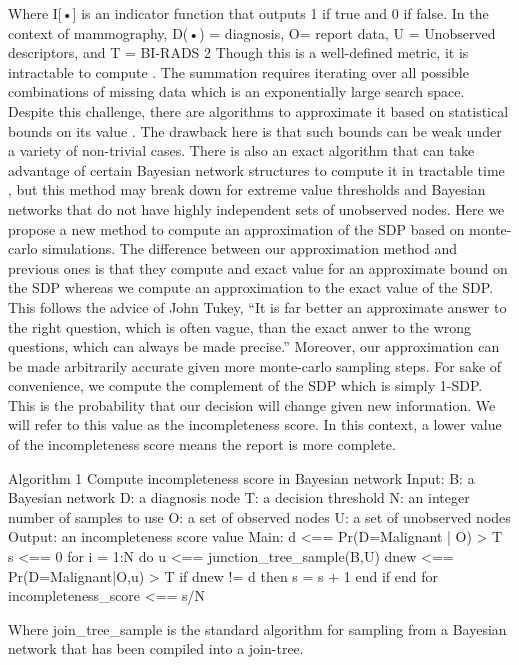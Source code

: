 Where I[•] is an indicator function that outputs 1 if true and 0 if false. 
In the context of mammography, D(•) = diagnosis, O= report data, U = Unobserved descriptors, and T = BI-RADS 2%
Though this is a well-defined metric, it is intractable to compute \cite{Chen:2013tw}. The summation requires iterating over all possible combinations of missing data which is an exponentially large search space. Despite this challenge, there are algorithms to approximate it based on statistical bounds on its value \cite{Choi:2012id}. The drawback here is that such bounds can be weak under a variety of non-trivial cases. There is also an exact algorithm that can take advantage of certain Bayesian network structures to compute it in tractable time \cite{Chen:2013tw}, but this method may break down for extreme value thresholds and Bayesian networks that do not have highly independent sets of unobserved nodes.
Here we propose a new method to compute an approximation of the SDP based on monte-carlo simulations. The difference between our approximation method and previous ones\cite{Choi:2012id} is that they compute and exact value for an approximate bound on the SDP whereas we compute an approximation to the exact value of the SDP. This follows the advice of John Tukey, “It is far better an approximate answer to the right question, which is often vague, than the exact anwer to the wrong questions, which can always be made precise.” \cite{Tukey:1962vw} Moreover, our approximation can be made arbitrarily accurate given more monte-carlo sampling steps.
For sake of convenience, we compute the complement of the SDP which is simply 1-SDP. This is the probability that our decision will change given new information. We will refer to this value as the incompleteness score. In this context, a lower value of the incompleteness score means the report is more complete.





Algorithm 1 Compute incompleteness score in Bayesian network
Input:
B: a Bayesian network
D: a diagnosis node
T: a decision threshold
N: an integer number of samples to use
O: a set of observed nodes
U: a set of unobserved nodes
Output: an incompleteness score value
Main:
d <== Pr(D=Malignant | O) > T
s <== 0
for i = 1:N do
u <== junction\_tree\_sample(B,U)
dnew <== Pr(D=Malignant|O,u) > T
if dnew != d then
s = s + 1
end if
end for
incompleteness\_score <== s/N

Where join\_tree\_sample is the standard algorithm for sampling from a Bayesian network that has been compiled into a join-tree.
